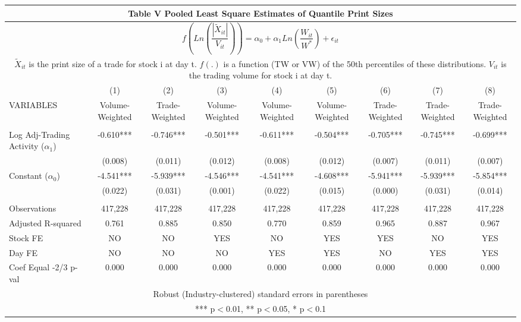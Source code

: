 \documentclass[12pt,a4paper]{article}
\begin{document}
\newpage
\begin{landscape}
\begin{table}
\begin{center}
\scriptsize
\begin{tabular}{lcccccccc}
\multicolumn{9}{c}{Table V Pooled Least Square Estimates of Quantile Print Sizes} \\ \hline
\multicolumn{9}{c}{$f(Ln(\dfrac{|\tilde{X}_{it}|}{V_{it}})) = \alpha_{0} + \alpha_{1}Ln(\dfrac{W_{it}}{W^{*}}) + \epsilon_{it}$} \\ 
\multicolumn{9}{c}{$\tilde{X}_{it}$ is the print size of a trade for stock i at day t. $f(.)$ is a function (TW or VW) of the 50th percentiles of these distributions. $V_{it}$ is the trading volume for stock i at day t.} \\
 & (1) & (2) & (3) & (4) & (5) & (6) & (7) & (8) \\
VARIABLES & Volume-Weighted & Trade-Weighted & Volume-Weighted & Volume-Weighted & Volume-Weighted & Trade-Weighted & Trade-Weighted & Trade-Weighted \\ \hline
 &  &  &  &  &  &  &  &  \\
Log Adj-Trading Activity ($\alpha_{1}$) & -0.610*** & -0.746*** & -0.501*** & -0.611*** & -0.504*** & -0.705*** & -0.745*** & -0.699*** \\
 & (0.008) & (0.011) & (0.012) & (0.008) & (0.012) & (0.007) & (0.011) & (0.007) \\
Constant ($\alpha_{0}$) & -4.541*** & -5.939*** & -4.546*** & -4.541*** & -4.608*** & -5.941*** & -5.939*** & -5.854*** \\
 & (0.022) & (0.031) & (0.001) & (0.022) & (0.015) & (0.000) & (0.031) & (0.014) \\
 &  &  &  &  &  &  &  &  \\
Observations & 417,228 & 417,228 & 417,228 & 417,228 & 417,228 & 417,228 & 417,228 & 417,228 \\
Adjusted R-squared & 0.761 & 0.885 & 0.850 & 0.770 & 0.859 & 0.965 & 0.887 & 0.967 \\
Stock FE & NO & NO & YES & NO & YES & YES & NO & YES \\
Day FE & NO & NO & NO & YES & YES & NO & YES & YES \\
 Coef Equal -2/3 p-val & 0.000 & 0.000 & 0.000 & 0.000 & 0.000 & 0.000 & 0.000 & 0.000 \\ \hline
\multicolumn{9}{c}{ Robust (Industry-clustered) standard errors in parentheses} \\
\multicolumn{9}{c}{ *** p$<$0.01, ** p$<$0.05, * p$<$0.1} \\
\end{tabular}
\end{center}
\end{table}
\end{landscape}
\end{document}

